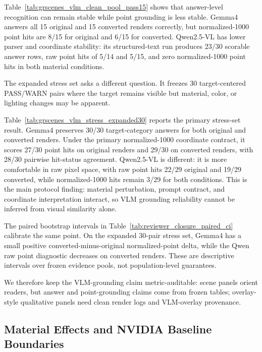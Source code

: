 

Table~\ref{tab:grscenes_vlm_clean_pool_pass15} shows that answer-level
recognition can remain stable while point grounding is less stable. Gemma4
answers all 15 original and 15 converted renders correctly, but normalized-1000
point hits are 8/15 for original and 6/15 for converted. Qwen2.5-VL has lower
parser and coordinate stability: its structured-text run produces 23/30
scorable answer rows, raw point hits of 5/14 and 5/15, and zero normalized-1000
point hits in both material conditions.

The expanded stress set asks a different question. It freezes 30
target-centered PASS/WARN pairs where the target remains visible but material,
color, or lighting changes may be apparent.



Table~\ref{tab:grscenes_vlm_stress_expanded30} reports the primary stress-set
result. Gemma4 preserves 30/30 target-category answers for both original and
converted renders. Under the primary normalized-1000 coordinate contract, it
scores 27/30 point hits on original renders and 29/30 on converted renders,
with 28/30 pairwise hit-status agreement. Qwen2.5-VL is different: it is more
comfortable in raw pixel space, with raw point hits 22/29 original and 19/29
converted, while normalized-1000 hits remain 3/29 for both conditions. This is
the main protocol finding: material perturbation, prompt contract, and
coordinate interpretation interact, so VLM grounding reliability cannot be
inferred from visual similarity alone.



The paired bootstrap intervals in Table~\ref{tab:reviewer_closure_paired_ci}
calibrate the same point. On the expanded 30-pair stress set, Gemma4 has a small
positive converted-minus-original normalized-point delta, while the Qwen raw
point diagnostic decreases on converted renders. These are descriptive
intervals over frozen evidence pools, not population-level guarantees.

We therefore keep the VLM-grounding claim metric-auditable: scene panels orient
readers, but answer and point-grounding claims come from frozen tables;
overlay-style qualitative panels need clean render logs and VLM-overlay
provenance.

\subsection{Material Effects and NVIDIA Baseline Boundaries}
\label{sec:material_effect_baseline}

